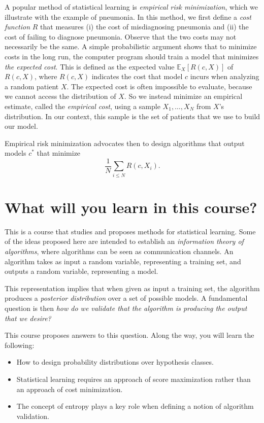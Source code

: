 A popular method of statistical learning is \emph{empirical risk minimization},
which we illustrate with the example of pneumonia.
In this method, we first define a \emph{cost function} $R$ that measures (i) the
cost of misdiagnosing pneumonia and (ii) the cost of failing to diagnose
pneumonia. Observe that the two costs may not necessarily be the same.
A simple probabilistic argument shows that to minimize costs in the
long run, the computer program should train a model that minimizes \emph{the
expected cost}. This is defined as the expected value $\mathbb{E}_X\left[R(c, X)\right]$ of $R(c,X)$,
where $R(c, X)$ indicates the cost that model $c$ incurs when analyzing a
random patient $X$.
The expected cost is often impossible to evaluate, because we cannot
access the distribution of $X$. So we instead minimize an empirical estimate, called the \emph{empirical cost}, using a sample $X_1, \ldots, X_N$ from $X$'s distribution. In our context, this sample is the set of patients that we use
to build our model.

Empirical risk minimization advocates then to design algorithms that
output models $c^*$ that minimize
%
\begin{equation}
\frac{1}{N}\sum_{i \leq N}R(c, X_i).
\end{equation}
%

\section*{What will you learn in this course?}

This is a course that studies and proposes methods for statistical learning.
Some of the ideas proposed here are intended to establish an \emph{information
theory of algorithms}, where algorithms can be seen as communication
channels. An algorithm takes as input a random variable, representing a
training set, and outputs a random variable, representing a model.

This representation implies that when given as input a training
set, the algorithm produces a \emph{posterior distribution} over a set of possible
models. A fundamental question is then \emph{how do we validate that the
algorithm is producing the output that we desire?}

This course proposes answers to this question. Along the way, you will
learn the following:

\begin{itemize}
\item How to design probability distributions over hypothesis classes.
\item Statistical learning requires an approach of score maximization rather
than an approach of cost minimization.
\item The concept of entropy plays a key role when defining a notion of
algorithm validation.
\end{itemize}

